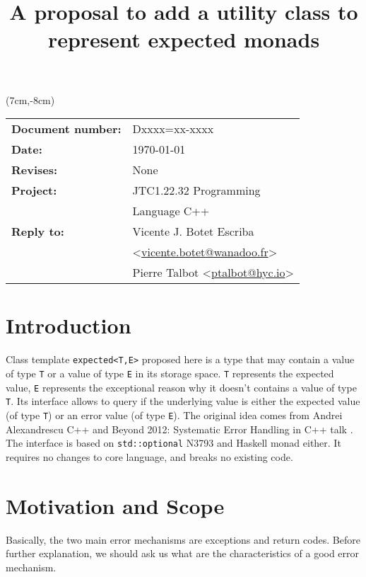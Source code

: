 \documentclass[a4paper,10pt]{article}
\title{A proposal to add a utility class to represent expected monads}
\author{}
\date{}
\newcommand{\cpp}[1]{\lstinline{#1}}
\begin{document}
\maketitle
\begin{textblock*}{9cm}(7cm,-8cm)
\begin{tabular}{l l}
\textbf{Document number:} & Dxxxx=xx-xxxx \\
\textbf{Date:}  & \today \\
\textbf{Revises:} & None \\
\textbf{Project:} & JTC1.22.32 Programming \\
 & Language C++ \\
\textbf{Reply to:} & Vicente J. Botet Escriba \\
 & <\href{mailto:vicente.botet@wanadoo.fr}{vicente.botet@wanadoo.fr}> \\
 & Pierre Talbot <\href{mailto:ptalbot@hyc.io}{ptalbot@hyc.io}>
\end{tabular}
\end{textblock*}

\vspace{-6em}
\setcounter{tocdepth}{1}
\tableofcontents

\section{Introduction}

Class template \cpp{expected<T,E>} proposed here is a type that may contain a value of type \cpp{T} or a value of type \cpp{E} in its storage space. \cpp{T} represents the expected value, \cpp{E} represents the exceptional reason why it doesn't contains a value of type \cpp{T}. Its interface allows to query if the underlying value is either the expected value (of type \cpp{T}) or an error value (of type \cpp{E}). The original idea comes from Andrei Alexandrescu C++ and Beyond 2012: Systematic Error Handling in C++ talk \cite{AlexandrescuExpected}. The interface is based on \cpp{std::optional} N3793 \cite{OptionalRev5} and Haskell monad either. It requires no changes to core language, and breaks no existing code.

\section{Motivation and Scope}

Basically, the two main error mechanisms are exceptions and return codes. Before further explanation, we should ask us what are the characteristics of a good error mechanism.
\end{document}
